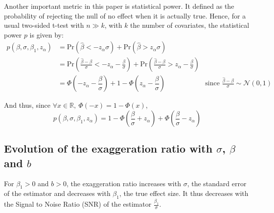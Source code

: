 \documentclass[a4paper, 11pt]{report}
\begin{document}
			Another important metric in this paper is statistical power. It defined as the probability of rejecting the null of no effect when it is actually true. Hence, for a usual two-sided t-test with $n \gg k$, with $k$ the number of covariates, the statistical power $p$ is given by:
			~
			\begin{align*}
				p(\beta, \sigma, \beta_{1}, z_{\alpha}) & = \text{Pr}(\hat{\beta} < - z_{\alpha}\sigma ) + \text{Pr}(\hat{\beta} > z_{\alpha}\sigma)\\
				  & = \text{Pr}\left(\frac{\hat{\beta} - \beta}{\sigma} < - z_{\alpha} - \frac{\beta}{\sigma} \right) + \text{Pr}\left(\frac{\hat{\beta} - \beta}{\sigma} > z_{\alpha} - \frac{\beta}{\sigma} \right)\\
				  & =  \Phi \left( - z_{\alpha} - \dfrac{\beta}{\sigma} \right) + 1 -  \Phi \left( z_{\alpha} - \dfrac{\beta}{\sigma} \right)  &  \text{since } \frac{\hat{\beta} - \beta}{\sigma} \sim \mathcal{N}(0,1)
			\end{align*}
			
			And thus, since $\forall x \in  \mathbb{R}, \ \Phi(-x) = 1 - \Phi(x)$,
			~
			\begin{equation}
				\boxed{
					p(\beta, \sigma, \beta_{1}, z_{\alpha})  =  1 - \Phi \left( \dfrac{\beta}{\sigma} + z_{\alpha} \right) + \Phi\left( \frac{\beta}{\sigma} - z_{\alpha} \right)
				}
			\end{equation}
				
			
		\subsection{Evolution of the exaggeration ratio with $\sigma$,  $\beta$ and $b$}
		
			\begin{corollary}\label{corollary_evol_exagg}
				For  $\beta_{1} > 0$ and $b > 0$, the exaggeration ratio increases with $\sigma$, the standard error of the estimator and decreases with $\beta_{1}$, the true effect size. It thus decreases with the Signal to Noise Ratio (SNR) of the estimator $\frac{\beta_{1}}{\sigma}$.
			\end{corollary}
			
\end{document}
